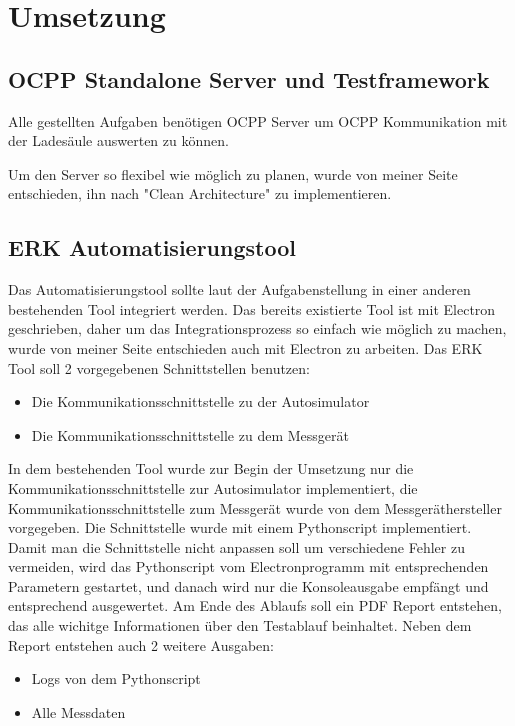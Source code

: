 \section{Umsetzung}
    \subsection{OCPP Standalone Server und Testframework}
        Alle gestellten Aufgaben benötigen OCPP Server um OCPP Kommunikation mit der Ladesäule auswerten zu können.

        Um den Server so flexibel wie möglich zu planen, wurde von meiner Seite entschieden, ihn nach "Clean Architecture" zu implementieren.
    \subsection{ERK Automatisierungstool}
        Das Automatisierungstool sollte laut der Aufgabenstellung in einer anderen bestehenden Tool integriert werden.
        Das bereits existierte Tool ist mit Electron geschrieben, daher um das Integrationsprozess so einfach wie möglich zu machen,
        wurde von meiner Seite entschieden auch mit Electron zu arbeiten. Das ERK Tool soll 2 vorgegebenen Schnittstellen benutzen:
        \begin{itemize}
            \item Die Kommunikationsschnittstelle zu der Autosimulator
            \item Die Kommunikationsschnittstelle zu dem Messgerät 
        \end{itemize}

        In dem bestehenden Tool wurde zur Begin der Umsetzung nur die Kommunikationsschnittstelle zur Autosimulator implementiert,
        die Kommunikationsschnittstelle zum Messgerät wurde von dem Messgeräthersteller vorgegeben. Die Schnittstelle wurde mit einem Pythonscript implementiert.
        Damit man die Schnittstelle nicht anpassen soll um verschiedene Fehler zu vermeiden, wird das Pythonscript vom Electronprogramm mit entsprechenden Parametern gestartet, 
        und danach wird nur die Konsoleausgabe empfängt und entsprechend ausgewertet. Am Ende des Ablaufs soll ein PDF Report entstehen, das alle wichitge Informationen
        über den Testablauf beinhaltet. Neben dem Report entstehen auch 2 weitere Ausgaben:
        \begin{itemize}
            \item Logs von dem Pythonscript
            \item Alle Messdaten
        \end{itemize}

